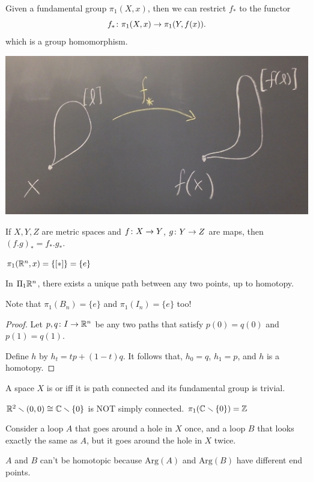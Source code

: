 \documentclass[11pt,leqno,oneside]{amsart}
\numberwithin{thm}{section}
\newcommand{\minus}{\smallsetminus}
\newcommand{\fund}[1][1]{\pi_{#1}}
\newcommand{\Arg}{\text{Arg}}
\begin{document}
\begin{prop}
  Given a fundamental group $\fund(X, x)$, then we can restrict $f_*$
  to the functor $$f_* \from \fund(X, x) \to \fund(Y, f(x)).$$ which is a group homomorphism.

  \includegraphics[scale=0.17]{images/fundamental-functor}
\end{prop}
\begin{prop}
  If $X,Y,Z$ are metric spaces and $f \colon X \to Y$, $g \colon Y \to Z$ are
  maps, then ${(f.g)}_* = f_*.g_*$.
\end{prop}

\begin{example}
  $\fund(\R^n, x) = \{[*]\} = \{e\}$

  In $\Pi_1 {\mathbb R}^n$, there exists a unique path between any two points,
  up to homotopy.

  Note that $\fund(B_n) = \{e\}$ and $\fund(I_n) = \{e\}$ too!
\end{example}
\begin{proof}
  Let $p,q \colon I \to {\mathbb R}^n$ be any two paths that satisfy $p(0) = q(0)$ and $p(1) = q(1)$.

  Define $h$ by $h_t = tp + (1-t)q$.  It follows that, $h_0 = q$, $h_1 = p$, and $h$ is a homotopy.
\end{proof}

\begin{defn} %
  A space $X$ is  or  iff it is path connected and its
  fundamental group is trivial.
\end{defn}
\begin{example}
  $\R^2 \minus (0,0) \isom \C \minus \{0\}$ is NOT simply connected.
  $\fund(\C \minus \{0\}) = \Z$
\end{example}
\begin{example}
  Consider a loop $A$ that goes around a hole in $X$ once, and a loop $B$ that looks exactly the same as $A$, but it goes around the hole in $X$ twice.

  $A$ and $B$ can't be homotopic because $\Arg(A)$ and $\Arg(B)$ have
  different end points.
\end{example}
\end{document}
